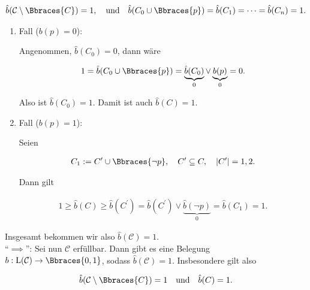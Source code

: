 \begin{solution}
\begin{align*}
    \hat b(\mathcal C \setminus \Bbraces{C}) = 1,
    \quad
    \text{und}
    \quad
    \hat b(C_0 \cup \Bbraces{p}) = \hat b(C_1) = \dots = \hat b(C_n) = 1.
\end{align*}

\begin{enumerate}[label = \arabic*.]

    \item Fall ($b(p) = 0$):
    
    Angenommen, $\hat b(C_0) = 0$, dann wäre

    \begin{align*}
        1
        =
        \hat b(C_0 \cup \Bbraces{p})
        =
        \underbrace{\hat b(C_0)}_0
        \lor
        \underbrace{b(p)}_0
        =
        0.
    \end{align*}

    Also ist $\hat b(C_0) = 1$.
    Damit ist auch $\hat b(C) = 1$.

    \item Fall ($b(p) = 1$):
    
    Seien

    \begin{align*}
        C_1 := C^\prime \cup \Bbraces{\neg p},
        \quad
        C^\prime \subseteq C,
        \quad
        |C^\prime| = 1, 2.
    \end{align*}

    Dann gilt

    \begin{align*}
        1
        \geq
        \hat b(C)
        \geq
        \hat b(C^\prime)
        =
        \hat b(C^\prime)
        \lor \underbrace{\hat b(\neg p)}_0
        =
        \hat b(C_1)
        =
        1.
    \end{align*}

\end{enumerate}

Insgesamt bekommen wir also $\hat b(\mathcal C) = 1$. \\

\enquote{$\implies$}:
Sei nun $\mathcal C$ erfüllbar.
Dann gibt es eine Belegung $b: \operatorname L(\mathcal C) \to \Bbraces{0, 1}$, sodass $\hat b(\mathcal C) = 1$.
Insbesondere gilt also

\begin{align*}
    \hat b(\mathcal C \setminus \Bbraces{C}) = 1
    \quad
    \text{und}
    \quad
    \hat b(C) = 1.
\end{align*}


\end{solution}

